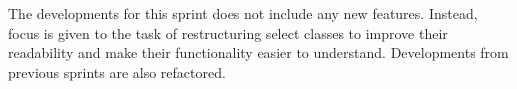 The developments for this sprint does not include any new features.
Instead, focus is given to the task of restructuring select classes to improve their readability and make their functionality easier to understand.
Developments from previous sprints are also refactored.